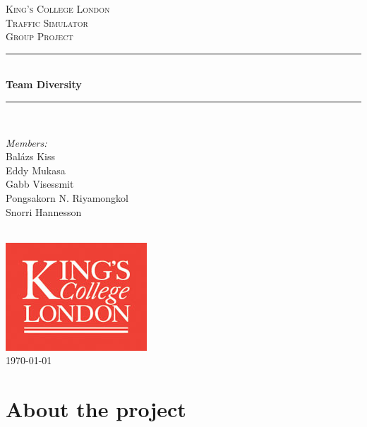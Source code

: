 \documentclass[11pt]{article}
\begin{document}

\begin{titlepage}

\newcommand{\HRule}{\rule{\linewidth}{0.5mm}}
\center
\textsc{\LARGE King's College London}\\[1.5cm]
\textsc{\Large Traffic Simulator}\\[0.5cm]
\textsc{\large Group Project}\\[0.5cm]
\HRule \\[0.4cm]
{ \huge \bfseries Team Diversity}\\[0.4cm]
\HRule \\[1.5cm]

\begin{minipage}{0.4\textwidth} \large
\begin{center}
\emph{Members:}\\
Balázs Kiss \\
Eddy Mukasa \\
Gabb Visessmit \\
Pongsakorn N. Riyamongkol \\
Snorri Hannesson
\end{center}
\end{minipage}
\\[2cm]

\includegraphics{KingsLogo}\\[1cm] 

{\large \today}\\[3cm]

\vfill

\end{titlepage}


\section{About the project}
\end{document}
